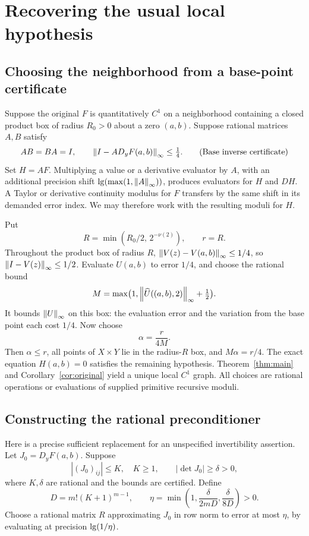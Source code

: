 \section{Recovering the usual local hypothesis}\label{sec:local}

\subsection{Choosing the neighborhood from a base-point certificate}

Suppose the original \(F\) is quantitatively \(C^1\) on a
neighborhood containing a closed product box of radius \(R_0>0\)
about a zero \((a,b)\). Suppose rational matrices \(A,B\) satisfy
\[
 AB=BA=I,\qquad
 \left\lVert I-A D_yF(a,b)\right\rVert_\infty\le\tfrac14.
 \tag{Base inverse certificate}
\]
Set \(H=AF\). Multiplying a value or a derivative evaluator by
\(A\), with an additional precision shift
\(\operatorname{lg}(\max(1,\left\lVert A\right\rVert_\infty))\), produces evaluators for \(H\) and
\(D H\). A Taylor or derivative continuity modulus for \(F\)
transfers by the same shift in its demanded error index.
We may therefore work with the resulting moduli for \(H\).

Put
\[
 R=\min(R_0/2,\,2^{-\nu(2)}),\qquad r=R.
\]
Throughout the product box of radius \(R\),
\(\left\lVert V(z)-V(a,b)\right\rVert_\infty\le1/4\), so
\(\left\lVert I-V(z)\right\rVert_\infty\le1/2\).
Evaluate \(U(a,b)\) to error \(1/4\), and choose the rational
bound
\[
 M=\max\bigl(1,\left\lVert\widehat U((a,b),2)\right\rVert_\infty+\tfrac12\bigr).
\]
It bounds \(\left\lVert U\right\rVert_\infty\) on this box: the evaluation error and
the variation from the base point each cost \(1/4\).
Now choose
\[
 \alpha=\frac{r}{4M}.
\]
Then \(\alpha\le r\), all points of \(X\times Y\) lie in the
radius-\(R\) box, and \(M\alpha=r/4\).
The exact equation \(H(a,b)=0\) satisfies the remaining
hypothesis. Theorem~\ref{thm:main} and
Corollary~\ref{cor:original} yield a unique local \(C^1\) graph.
All choices are rational operations or evaluations of supplied
primitive recursive moduli.

\subsection{Constructing the rational preconditioner}
\label{sec:conditioning}

Here is a precise sufficient replacement for an unspecified
invertibility assertion. Let \(J_0=D_yF(a,b)\). Suppose
\[
 |(J_0)_{ij}|\le K,\quad K\ge1,\qquad
 |\det J_0|\ge\delta>0,
\]
where \(K,\delta\) are rational and the bounds are certified.
Define
\[
 D=m!(K+1)^{m-1},\qquad
 \eta=\min\left(1,\frac{\delta}{2mD},
                         \frac{\delta}{8D}\right)>0.
\]
Choose a rational matrix \(R\) approximating \(J_0\) in row norm
to error at most \(\eta\), by evaluating at precision
\(\operatorname{lg}(1/\eta)\).

